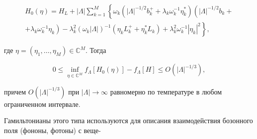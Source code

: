 \documentclass[10pt]{article}
\begin{document}
\[

\begin{gathered}

H_{0}(\eta)=H_{L}+|\Lambda| \sum_{k=1}^{M}\left\{\omega _ { k } ( | \Lambda | ^ { - 1 / 2 } b _ { k } ^ { + } + \lambda _ { k } \omega _ { k } ^ { - 1 } \eta _ { k } ^ { * } ) \left(|\Lambda|^{-1 / 2} b_{k}+\right.\right. \\

\left.\left.+\lambda_{k} \omega_{k}^{-1} \eta_{k}\right)-\lambda_{k}^{2}\left(\omega_{k}|\Lambda|\right)^{-1}\left(\eta_{k} L_{k}^{+}+\eta_{k}^{*} L_{k}\right)+\lambda_{k}^{2} \omega_{k}^{-1}\left|\eta_{k}\right|^{2}\right\},

\end{gathered}

\]



где $\eta=\left(\eta_{1}, \ldots, \eta_{M}\right) \in \mathbb{C}^{M}$. Тогда



\[

0 \leqslant \inf _{\eta \in \mathbb{C}^{M}} f_{\Lambda}\left[H_{0}(\eta)\right]-f_{\Lambda}[H] \leqslant O\left(|\Lambda|^{-1 / 3}\right),

\]



причем $O\left(|\Lambda|^{-1 / 3}\right)$ при $|\Lambda| \rightarrow \infty$ равномерно по температуре в любом ограниченном интервале.



Гамильтонианы этого типа используются для описания взаимодействия бозонного поля (фононы, фотоны) с веще-
\end{document}
